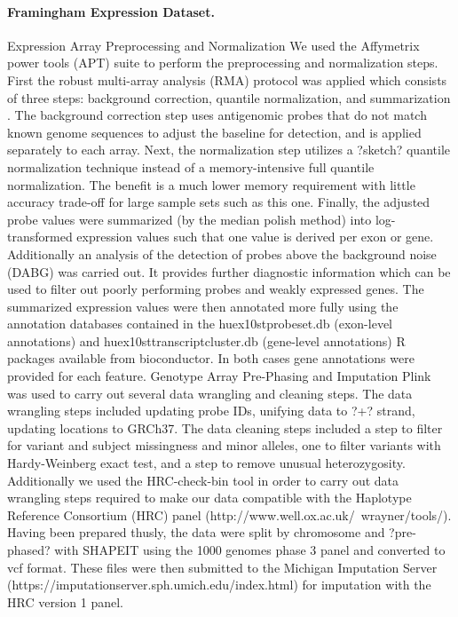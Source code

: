 \documentclass[10pt,letterpaper]{article}
\begin{document}
\paragraph*{Framingham Expression Dataset.}\label{framingham-dataset}

Expression Array Preprocessing and Normalization
We used the Affymetrix power tools (APT) suite to perform the preprocessing and normalization steps. First the robust multi-array analysis (RMA) protocol was applied which consists of three steps: background correction, quantile normalization, and summarization \cite{irizarry2003summaries}. The background correction step uses antigenomic probes that do not match known genome sequences to adjust the baseline for detection, and is applied separately to each array. Next, the normalization step utilizes a ?sketch? quantile normalization technique instead of a memory-intensive full quantile normalization. The benefit is a much lower memory requirement with little accuracy trade-off for large sample sets such as this one. Finally, the adjusted probe values were summarized (by the median polish method) into log-transformed expression values such that one value is derived per exon or gene. Additionally an analysis of the detection of probes above the background noise (DABG) was carried out. It provides further diagnostic information which can be used to filter out poorly performing probes and weakly expressed genes.  The summarized expression values were then annotated more fully using the annotation databases contained in the huex10stprobeset.db (exon-level annotations) and huex10sttranscriptcluster.db (gene-level annotations) R packages available from bioconductor. In both cases gene annotations were provided for each feature. 
Genotype Array Pre-Phasing and Imputation
Plink was used to carry out several data wrangling and cleaning steps. The data wrangling steps included updating probe IDs, unifying data to ?+? strand, updating locations to GRCh37. The data cleaning steps included a step to filter for variant and subject missingness and minor alleles, one to filter variants with Hardy-Weinberg exact test, and a step to remove unusual heterozygosity. Additionally we used the HRC-check-bin tool in order to carry out data wrangling steps required to make our data compatible with the Haplotype Reference Consortium (HRC) panel (http://www.well.ox.ac.uk/~wrayner/tools/). Having been prepared thusly, the data were split by chromosome and ?pre-phased? with SHAPEIT using the 1000 genomes phase 3 panel and converted to vcf format. These files were then submitted to the Michigan Imputation Server (https://imputationserver.sph.umich.edu/index.html) for imputation with the HRC version 1 panel. 
\end{document}
